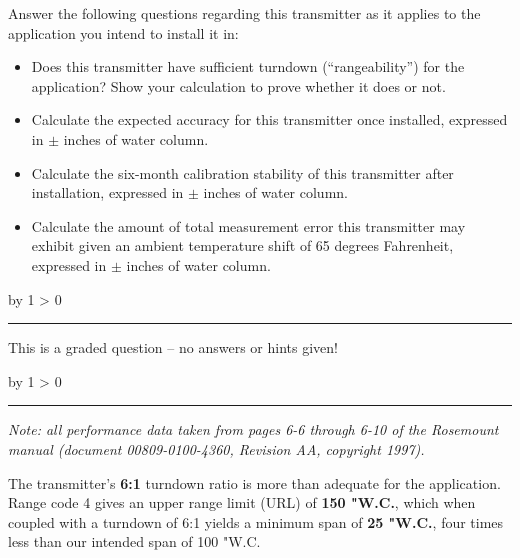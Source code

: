 \documentclass[12pt,a4paper]{article}
\def\svar{
           \advance\answnum by 1
           \ifnum \answnum > 0
                \hrule
                \vskip 3pt
                \leftline{Svar \the\answnum}
                \vskip 3pt \fi}
\def\notes{
           \advance\explnum by 1
           \ifnum \explnum > 0
                \hrule
                \vskip 3pt
                \leftline{Notes \the\explnum}
                \vskip 3pt \fi}
\begin{document}
Answer the following questions regarding this transmitter as it applies to the application you intend to install it in:

\vskip 20pt

\begin{itemize}
\item{} Does this transmitter have sufficient turndown (``rangeability'') for the application?  Show your calculation to prove whether it does or not.

\vskip 50pt

\item{} Calculate the expected accuracy for this transmitter once installed, expressed in $\pm$ inches of water column.

\vskip 50pt

\item{} Calculate the six-month calibration stability of this transmitter after installation, expressed in $\pm$ inches of water column.

\vskip 50pt

\item{} Calculate the amount of total measurement error this transmitter may exhibit given an ambient temperature shift of 65 degrees Fahrenheit, expressed in $\pm$ inches of water column.


\end{itemize}

\vfil 

\eject
\vskip 10pt \filbreak 





\svar{} 

This is a graded question -- no answers or hints given!

\vskip 10pt \filbreak 





\notes{} 

{\it Note: all performance data taken from pages 6-6 through 6-10 of the Rosemount manual (document 00809-0100-4360, Revision AA, copyright 1997).}

\vskip 10pt

The transmitter's {\bf 6:1} turndown ratio is more than adequate for the application.  Range code 4 gives an upper range limit (URL) of {\bf 150 "W.C.}, which when coupled with a turndown of 6:1 yields a minimum span of {\bf 25 "W.C.}, four times less than our intended span of 100 "W.C.

\vskip 10pt
\end{document}
